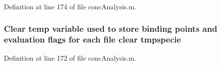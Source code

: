 Definition at line 174 of file conc\+Analysis.\+m.

\hypertarget{a00025_a045ecd9b02a87529b837dde223b08719}{
\subsubsection[{tmpspecie}]{\setlength{\rightskip}{0pt plus 5cm}Clear temp variable used {\bf to} store binding points {\bf and} evaluation flags for each {\bf file} clear tmpspecie}}\label{a00025_a045ecd9b02a87529b837dde223b08719}


Definition at line 172 of file conc\+Analysis.\+m.

